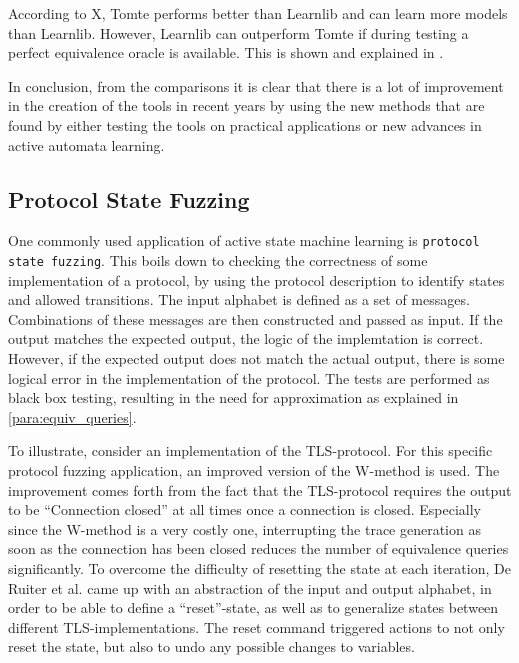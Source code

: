 \documentclass[multi,crop=false,class=article]{standalone}
\begin{document}
According to X, Tomte performs better than Learnlib and can learn more models
than Learnlib. However, Learnlib can outperform Tomte if during testing a
perfect equivalence oracle is available. This is shown and explained in
\cite{Aarts2014}.


In conclusion, from the comparisons it is clear that there is a lot of
improvement in the creation of the tools in recent years by using the new
methods that are found by either testing the tools on practical applications or
new advances in active automata learning.

\subsection{Protocol State Fuzzing}
One commonly used application of active state machine learning is
\texttt{protocol state fuzzing}\cite{deRuiter15,Aarts13,Cho10,Aarts10}. This
boils down to checking the correctness of some implementation of a protocol, by
using the protocol description to identify states and allowed transitions. The
input alphabet is defined as a set of messages. Combinations of these messages
are then constructed and passed as input. If the output matches the expected
output, the logic of the implemtation is correct. However, if the expected
output does not match the actual output, there is some logical error in the
implementation of the protocol. The tests are performed as black box testing,
resulting in the need for approximation as explained in
\ref{para:equiv_queries}.

To illustrate, consider an implementation of the TLS-protocol\cite{deRuiter15}.
For this specific protocol fuzzing application, an improved version of the
W-method\cite{Chow78} is used. The improvement comes forth from the fact that
the TLS-protocol requires the output to be ``Connection closed'' at all times
once a connection is closed. Especially since the W-method is a very costly
one, interrupting the trace generation as soon as the connection has been
closed reduces the number of equivalence queries significantly.
To overcome the difficulty of resetting the state at each iteration, De Ruiter
et al. came up with an abstraction of the input and output alphabet, in order
to be able to define a ``reset''-state, as well as to generalize states between
different TLS-implementations. The reset command triggered actions to not only
reset the state, but also to undo any possible changes to variables.
\end{document}
